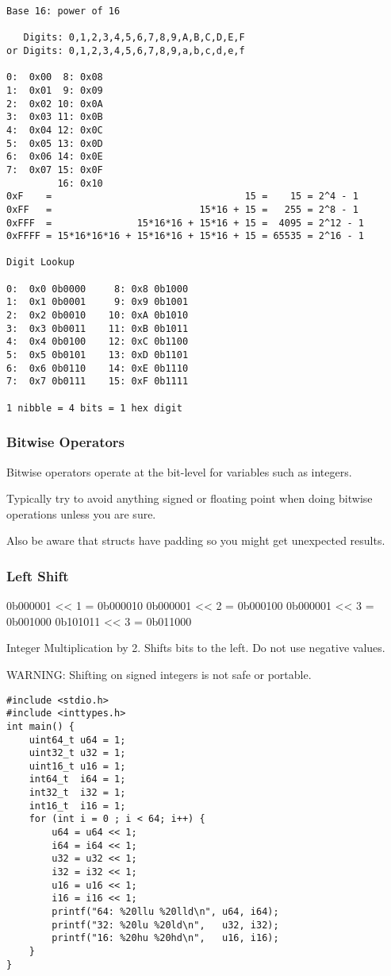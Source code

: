 \documentclass[11pt]{article}
\begin{document}
\begin{verbatim}
Base 16: power of 16

   Digits: 0,1,2,3,4,5,6,7,8,9,A,B,C,D,E,F
or Digits: 0,1,2,3,4,5,6,7,8,9,a,b,c,d,e,f

0:  0x00  8: 0x08
1:  0x01  9: 0x09   
2:  0x02 10: 0x0A  
3:  0x03 11: 0x0B   
4:  0x04 12: 0x0C  
5:  0x05 13: 0x0D  
6:  0x06 14: 0x0E           
7:  0x07 15: 0x0F  
         16: 0x10
0xF    =                                  15 =    15 = 2^4 - 1
0xFF   =                          15*16 + 15 =   255 = 2^8 - 1
0xFFF  =               15*16*16 + 15*16 + 15 =  4095 = 2^12 - 1
0xFFFF = 15*16*16*16 + 15*16*16 + 15*16 + 15 = 65535 = 2^16 - 1

Digit Lookup

0:  0x0 0b0000     8: 0x8 0b1000
1:  0x1 0b0001     9: 0x9 0b1001  
2:  0x2 0b0010    10: 0xA 0b1010 
3:  0x3 0b0011    11: 0xB 0b1011  
4:  0x4 0b0100    12: 0xC 0b1100 
5:  0x5 0b0101    13: 0xD 0b1101 
6:  0x6 0b0110    14: 0xE 0b1110          
7:  0x7 0b0111    15: 0xF 0b1111 

1 nibble = 4 bits = 1 hex digit
\end{verbatim}

\subsubsection{Bitwise Operators}
\label{sec:orgc97a5a3}

Bitwise operators operate at the bit-level for variables such as integers.

Typically try to avoid anything signed or floating point when doing
bitwise operations unless you are sure.

Also be aware that structs have padding so you might get unexpected
results.

\subsubsection{Left Shift}
\label{sec:orgef9e6fb}

0b000001 << 1 = 0b000010
0b000001 << 2 = 0b000100
0b000001 << 3 = 0b001000
0b101011 << 3 = 0b011000


Integer Multiplication by 2. Shifts bits to the left. Do not use negative values.

WARNING: Shifting on signed integers is not safe or portable.


\begin{verbatim}
#include <stdio.h>
#include <inttypes.h>
int main() {
    uint64_t u64 = 1;
    uint32_t u32 = 1;
    uint16_t u16 = 1;
    int64_t  i64 = 1;
    int32_t  i32 = 1;
    int16_t  i16 = 1;
    for (int i = 0 ; i < 64; i++) {
        u64 = u64 << 1;
        i64 = i64 << 1;
        u32 = u32 << 1;
        i32 = i32 << 1;
        u16 = u16 << 1;
        i16 = i16 << 1;
        printf("64: %20llu %20lld\n", u64, i64);
        printf("32: %20lu %20ld\n",   u32, i32);
        printf("16: %20hu %20hd\n",   u16, i16);
    }
}
\end{verbatim}
\end{document}

